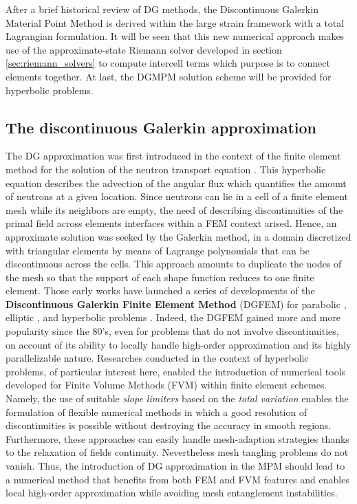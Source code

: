 After a brief historical review of DG methods, the Discontinuous Galerkin Material Point Method is derived within the large strain framework with a total Lagrangian formulation. It will be seen that this new numerical approach makes use of the approximate-state Riemann solver developed in section \ref{sec:riemann_solvers} to compute intercell terms which purpose is to connect elements together. At last, the DGMPM solution scheme will be provided for hyperbolic problems.

\subsection{The discontinuous Galerkin approximation}
The DG approximation was first introduced in the context of the finite element method for the solution of the neutron transport equation \cite{NeutronDG}. This hyperbolic equation describes the advection of the angular flux which quantifies the amount of neutrons at a given location. Since neutrons can lie in a cell of a finite element mesh while its neighbors are empty, the need of describing discontinuities of the primal field across elements interfaces within a FEM context arised. Hence, an approximate solution was seeked by the Galerkin method, in a domain discretized with triangular elements by means of Lagrange polynomials that can be discontinuous across the cells. This approach amounts to duplicate the nodes of the mesh so that the support of each shape function reduces to one finite element. Those early works have launched a series of developments of the \textbf{Discontinuous Galerkin Finite Element Method} (DGFEM) for parabolic \cite{Arnold_IPM}, elliptic \cite{Hansbo_DGsolid,Noel_HEDG}, and hyperbolic problems \cite{Cockburn}. Indeed, the DGFEM gained more and more popularity since the 80's, even for problems that do not involve discontinuities, on account of its ability to locally handle high-order approximation and its highly parallelizable nature. 
Researches conducted in the context of hyperbolic problems, of particular interest here, enabled the introduction of numerical tools developed for Finite Volume Methods (FVM) within finite element schemes.
Namely, the use of suitable \textit{slope limiters} \cite{vanLeer_Limiters} based on the \textit{total variation} \cite{Harten} enables the formulation of flexible numerical methods in which a good resolution of discontinuities is possible without destroying the accuracy in smooth regions. Furthermore, these approaches can easily handle mesh-adaption strategies thanks to the relaxation of fields continuity. Nevertheless mesh tangling problems do not vanish.
Thus, the introduction of DG approximation in the MPM should lead to a numerical method that benefits from both FEM and FVM features and enables local high-order approximation while avoiding mesh entanglement instabilities.


